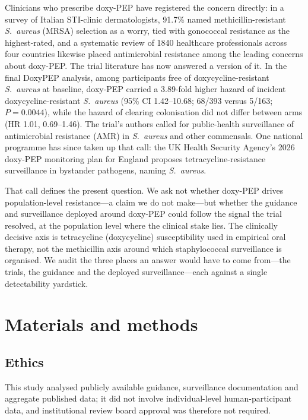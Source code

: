 \documentclass[12pt,a4paper]{article}
\newcommand{\sa}{\emph{S.~aureus}}
\begin{document}
Clinicians who prescribe doxy-PEP have registered the concern directly: in a
survey of Italian STI-clinic dermatologists, 91.7\% named methicillin-resistant
\sa{} (MRSA) selection as a worry, tied with gonococcal resistance as the
highest-rated,\cite{dona2026} and a systematic review of 1840 healthcare
professionals across four countries likewise placed antimicrobial resistance
among the leading concerns about doxy-PEP.\cite{spence2026} The trial literature has now answered a version of
it. In the final DoxyPEP analysis, among participants free of
doxycycline-resistant \sa{} at baseline, doxy-PEP carried a 3.89-fold higher
hazard of incident doxycycline-resistant \sa{} (95\% CI 1.42--10.68; 68/393
versus 5/163; $P=0.0044$), while the hazard of clearing colonisation did not
differ between arms (HR 1.01, 0.69--1.46).\cite{luetkemeyer2025} The trial's
authors called for public-health surveillance of antimicrobial resistance (AMR)
in \sa{} and other commensals. One national programme has since taken up that
call: the UK Health Security Agency's 2026 doxy-PEP monitoring plan for England
proposes tetracycline-resistance surveillance in bystander pathogens, naming
\sa{}.\cite{ukhsa2026}

That call defines the present question. We ask not whether doxy-PEP drives
population-level resistance---a claim we do not make---but whether the guidance
and surveillance deployed around doxy-PEP could follow the signal the trial
resolved, at the population level where the clinical stake lies. The clinically
decisive axis is tetracycline (doxycycline) susceptibility used in empirical oral
therapy, not the methicillin axis around which staphylococcal surveillance is
organised. We audit the three places an answer would have to come from---the
trials, the guidance and the deployed surveillance---each against a single
detectability yardstick.

\section*{Materials and methods}

\subsection*{Ethics}
This study analysed publicly available guidance, surveillance documentation and
aggregate published data; it did not involve individual-level human-participant
data, and institutional review board approval was therefore not required.
\end{document}
